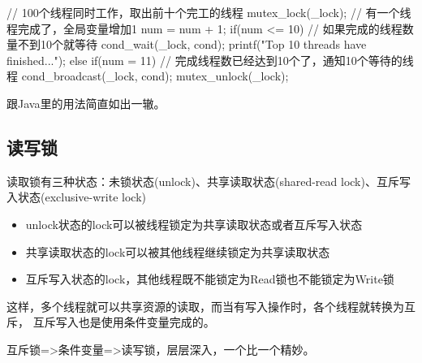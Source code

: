 \documentclass[a4paper,11pt]{article}
\begin{document}
\begin{cppcode}
  // 100个线程同时工作，取出前十个完工的线程
  mutex_lock(_lock);
  // 有一个线程完成了，全局变量增加1
  num = num + 1;
  if(num <= 10) {
    // 如果完成的线程数量不到10个就等待
    cond_wait(_lock, cond);
    printf("Top 10 threads have finished...");
  } else if(num = 11) {
    // 完成线程数已经达到10个了，通知10个等待的线程
    cond_broadcast(_lock, cond);
  }
  mutex_unlock(_lock);
\end{cppcode}

跟Java里的用法简直如出一辙。

\subsection[读写锁]{读写锁}
读取锁有三种状态：未锁状态(unlock)、共享读取状态(shared-read lock)、互斥写入状态(exclusive-write lock)

\begin{itemize}
\item unlock状态的lock可以被线程锁定为共享读取状态或者互斥写入状态
\item 共享读取状态的lock可以被其他线程继续锁定为共享读取状态
\item 互斥写入状态的lock，其他线程既不能锁定为Read锁也不能锁定为Write锁
\end{itemize}

这样，多个线程就可以共享资源的读取，而当有写入操作时，各个线程就转换为互斥，
互斥写入也是使用条件变量完成的。

互斥锁=>条件变量=>读写锁，层层深入，一个比一个精妙。
\end{document}
